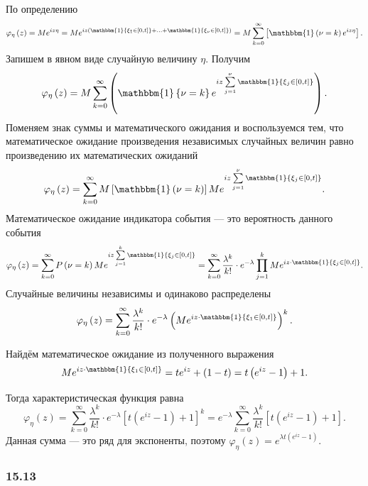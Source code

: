 По определению
$$ \varphi_{ \eta } \left( z \right) =
  Me^{iz \eta } =
  Me^{iz \left( \mathbbm{1} \left\{ \xi_1 \in \left[ 0, t \right] \right\} + \dotsc +
    \mathbbm{1} \left\{ \xi_{ \nu } \in \left[ 0, t \right] \right\} \right) } =
  M \sum \limits_{k = 0}^{ \infty }
    \left[ \mathbbm{1} \left( \nu = k \right) e^{iz \eta } \right].$$
Запишем в явном виде случайную величину $ \eta $.
Получим
$$ \varphi_{ \eta } \left( z \right) =
  M \sum \limits_{k = 0}^{ \infty } \left( \mathbbm{1} \left\{ \nu = k \right\}
  e^{iz \sum \limits_{j = 1}^{ \nu }
    \mathbbm{1} \left\{ \xi_j \in \left[ 0, t \right] \right\} } \right).$$
Поменяем знак суммы и математического ожидания и воспользуемся тем,
что математическое ожидание произведения независимых случайных величин равно произведению их
математических ожиданий
$$ \varphi_{ \eta } \left( z \right) =
  \sum \limits_{k = 0}^{ \infty } M \left[ \mathbbm{1} \left( \nu = k \right) \right]
  Me^{iz \sum \limits_{j = 1}^{ \nu }
    \mathbbm{1} \left\{ \xi_j \in \left[ 0, t \right] \right\} }.$$
Математическое ожидание индикатора события --- это вероятность данного события
$$ \varphi_{ \eta } \left( z \right) =
  \sum \limits_{k = 0}^{ \infty }
    P \left( \nu = k \right)
    Me^{iz \sum \limits_{j = 1}^k \mathbbm{1} \left\{ \xi_j \in \left[ 0, t \right] \right\} } =
  \sum \limits_{k = 0}^{ \infty } \frac{ \lambda^k}{k!} \cdot e^{- \lambda }
  \prod \limits_{j = 1}^k
    Me^{iz \cdot \mathbbm{1} \left\{ \xi_j \in \left[ 0, t \right] \right\} }.$$
Случайные величины независимы и одинаково распределены
$$  \varphi_{ \eta } \left( z \right) =
  \sum \limits_{k = 0}^{ \infty }
    \frac{ \lambda^k}{k!} \cdot e^{- \lambda}
    \left( Me^{iz \cdot \mathbbm{1} \left\{ \xi_1 \in \left[ 0, t \right] \right\} } \right)^k.$$

Найдём математическое ожидание из полученного выражения
$$Me^{iz \cdot \mathbbm{1} \left\{ \xi_1 \in \left[ 0, t \right] \right\} } =
  te^{iz} + \left( 1 - t \right) =
  t \left( e^{iz} - 1 \right) + 1.$$

Тогда характеристическая функция равна
$$ \varphi_{ \eta } \left( z \right) =
  \sum \limits_{k = 0}^{ \infty }
    \frac{ \lambda^k}{k!} \cdot e^{- \lambda } \left[ t \left( e^{iz} - 1 \right) + 1 \right]^k =
  e^{- \lambda }
  \sum \limits_{k = 0}^{ \infty }
    \frac{ \lambda^k}{k!} \left[ t \left( e^{iz} - 1 \right) + 1 \right].$$
Данная сумма --- это ряд для экспоненты, поэтому
$ \varphi_{ \eta } \left( z \right) =
  e^{ \lambda t \left( e^{iz} - 1 \right) }$.

\subsubsection*{15.13}

